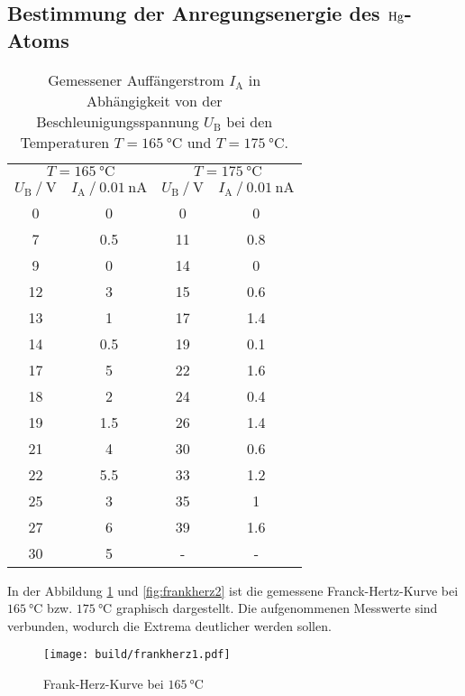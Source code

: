 \subsection{Bestimmung der Anregungsenergie des $\ce{Hg}$-Atoms}\label{sec:frank}
\begin{table}
    \centering
    \caption{Gemessener Auffängerstrom $I_\text{A}$ in Abhängigkeit von der Beschleunigungsspannung $U_\text{B}$ 
    bei den Temperaturen $T = \SI{165}{\celsius}$ und $T = \SI{175}{\celsius}$.}
    \label{tab:frankherz}
    \begin{tabular} {S[table-format=2.0] S[table-format=1.1] S[table-format=2.0] S[table-format=1.1]}
        \toprule
        & \\
        \cmidrule(lr){1-2}\cmidrule(lr){3-4}
        {$U_\text{B} \mathbin{/} \si{\volt}$} & {$I_\text{A} \mathbin{/} \SI{0.01}{\nano\ampere}$} & {$U_\text{B} \mathbin{/} \si{\volt}$} & {$I_\text{A} \mathbin{/} \SI{0.01}{\nano\ampere}$}\\
       &  0    &   0   & 0   \\
    7   &  0.5  &   11  & 0.8\\
    9   &  0    &   14  & 0   \\
    12  &  3    &   15  & 0.6\\
    13  &  1    &   17  & 1.4 \\   
    14  &  0.5  &   19  & 0.1\\
    17  &  5    &   22  & 1.6\\
    18  &  2    &   24  & 0.4\\
    19  &  1.5  &   26  & 1.4\\
    21  &  4    &   30  & 0.6\\
    22  &  5.5  &   33  & 1.2\\
    25  &  3    &   35  & 1   \\
    27  &  6    &   39  & 1.6\\
    30  &  5    &   {-} &{-}\\
    \bottomrule
\end{tabular}
\end{table}
In der Abbildung \ref{fig:frankherz1} und \ref{fig:frankherz2} ist die gemessene Franck-Hertz-Kurve bei $\SI{165}{\celsius}$ bzw. $\SI{175}{\celsius}$ 
graphisch dargestellt.
Die aufgenommenen Messwerte sind verbunden, wodurch die Extrema deutlicher werden sollen.
\begin{figure}
    \centering
    \caption{Frank-Herz-Kurve bei $\SI{165}{\celsius}$}
    \label{fig:frankherz1}
    \texttt{[image: build/frankherz1.pdf]}
\end{figure}
